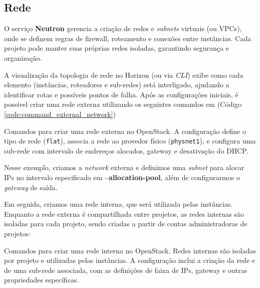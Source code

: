 \subsection{Rede}
O serviço \textbf{Neutron} gerencia a criação de redes e \textit{subnets} virtuais (ou VPCs), onde se definem regras de firewall, roteamento e conexões entre instâncias. Cada projeto pode manter suas próprias redes isoladas, garantindo segurança e organização.

A visualização da topologia de rede no Horizon (ou via \textit{CLI}) exibe como cada elemento (instâncias, roteadores e sub-redes) está interligado, ajudando a identificar rotas e possíveis pontos de falha. Após as configurações iniciais, é possível criar uma rede externa utilizando os seguintes comandos em (Código \ref{code:command_external_network})

\begin{listing}[h!]
    \noindent{}  
  \caption{Comandos para criar uma rede externa no OpenStack. A configuração define o tipo de rede (\texttt{flat}), associa a rede ao provedor físico (\texttt{physnet1}), e configura uma sub-rede com intervalo de endereços alocados, gateway e desativação do DHCP.}
  \label{code:command_external_network}
\end{listing}

Nesse exemplo, criamos a \textit{network} externa e definimos uma \textit{subnet} para alocar IPs no intervalo especificado em \textbf{--allocation-pool}, além de configurarmos o \textit{gateway} de saída.

Em seguida, criamos uma rede interna, que será utilizada pelas instâncias. Enquanto a rede externa é compartilhada entre projetos, as redes internas são isoladas para cada projeto, sendo criadas a partir de contas administradoras de projetos:

\begin{listing}[h!]
    \noindent{}  
  \caption{Comandos para criar uma rede interna no OpenStack. Redes internas são isoladas por projeto e utilizadas pelas instâncias. A configuração inclui a criação da rede e de uma sub-rede associada, com as definições de faixa de IPs, gateway e outras propriedades específicas.}
  \label{code:command_internal_network}
\end{listing}

